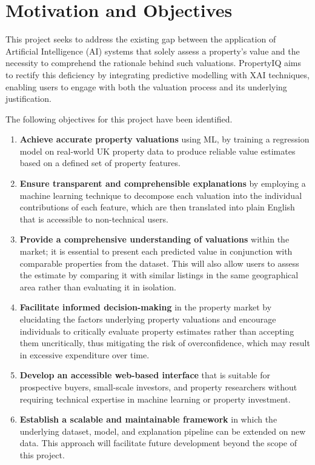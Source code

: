 \section{Motivation and Objectives}

This project seeks to address the existing gap between the application of Artificial Intelligence (AI) systems that solely assess a property's value and the necessity to comprehend the rationale behind such valuations. PropertyIQ aims to rectify this deficiency by integrating predictive modelling with XAI techniques, enabling users to engage with both the valuation process and its underlying justification. 

The following objectives for this project have been identified.

\begin{enumerate}

  \item \textbf{Achieve accurate property valuations} using ML, by training a regression model on real-world UK property data to produce reliable value estimates based on a defined set of property features.
  
  \item \textbf{Ensure transparent and comprehensible explanations} by employing a machine learning technique to decompose each valuation into the individual contributions of each feature, which are then translated into plain English that is accessible to non-technical users.
  
  \item \textbf{Provide a comprehensive understanding of valuations} within the market; it is essential to present each predicted value in conjunction with comparable properties from the dataset. This will also allow users to assess the estimate by comparing it with similar listings in the same geographical area rather than evaluating it in isolation.
  
  \item \textbf{Facilitate informed decision-making} in the property market by elucidating the factors underlying property valuations and encourage individuals to critically evaluate property estimates rather than accepting them uncritically, thus mitigating the risk of overconfidence, which may result in excessive expenditure over time.
  
  \item \textbf{Develop an accessible web-based interface} that is suitable for prospective buyers, small-scale investors, and property researchers without requiring technical expertise in machine learning or property investment.
  
  \item \textbf{Establish a scalable and maintainable framework} in which the underlying dataset, model, and explanation pipeline can be extended on new data. This approach will facilitate future development beyond the scope of this project.
  
\end{enumerate}


